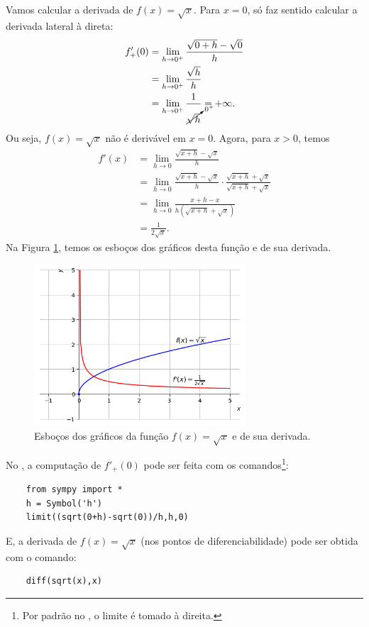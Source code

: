 \begin{ex}\label{ex:deriv_sqrtx}
  Vamos calcular a derivada de $f(x) = \sqrt{x}$. Para $x=0$, só faz sentido calcular a derivada lateral à direta:
  \begin{align}
    f'_{+}(0) &= \lim_{h\to 0^+} \frac{\sqrt{0+h}-\sqrt{0}}{h} \\
              &= \lim_{h\to 0^+} \frac{\sqrt{h}}{h} \\
              &= \lim_{h\to 0^+} \frac{1}{\cancelto{0^+}{\sqrt{h}}} = +\infty.
  \end{align}
  Ou seja, $f(x) = \sqrt{x}$ não é derivável em $x=0$. Agora, para $x> 0$, temos
  \begin{align}
    f'(x) &= \lim_{h\to 0} \frac{\sqrt{x+h}-\sqrt{x}}{h}\\
          &= \lim_{h\to 0} \frac{\sqrt{x+h}-\sqrt{x}}{h}\cdot \frac{\sqrt{x+h}+\sqrt{x}}{\sqrt{x+h}+\sqrt{x}}\\
          &= \lim_{h\to 0} \frac{x+h-x}{h(\sqrt{x+h}+\sqrt{x})}\\
          &= \frac{1}{2\sqrt{x}}.
  \end{align}
  Na Figura \ref{fig:deriv_ex_ffl_sqrtx}, temos os esboços dos gráficos desta função e de sua derivada.

  \begin{figure}[H]
    \centering
    \includegraphics[width=0.7\textwidth]{./cap_deriv/dados/fig_deriv_ex_ffl_sqrtx/fig_deriv_ex_ffl_sqrtx}
    \caption{Esboços dos gráficos da função $f(x)=\sqrt{x}$ e de sua derivada.}
    \label{fig:deriv_ex_ffl_sqrtx}
  \end{figure}

  \ifispython
  No \sympy, a computação de $f'_{+}(0)$ pode ser feita com os comandos\footnote{Por padrão no \sympy, o limite é tomado à direita.}:
  \begin{lstlisting}
    from sympy import *
    h = Symbol('h')
    limit((sqrt(0+h)-sqrt(0))/h,h,0)
  \end{lstlisting}
  E, a derivada de $f(x) = \sqrt{x}$ (nos pontos de diferenciabilidade) pode ser obtida com o comando:
  \begin{lstlisting}
    diff(sqrt(x),x)
  \end{lstlisting}
  \fi
\end{ex}

